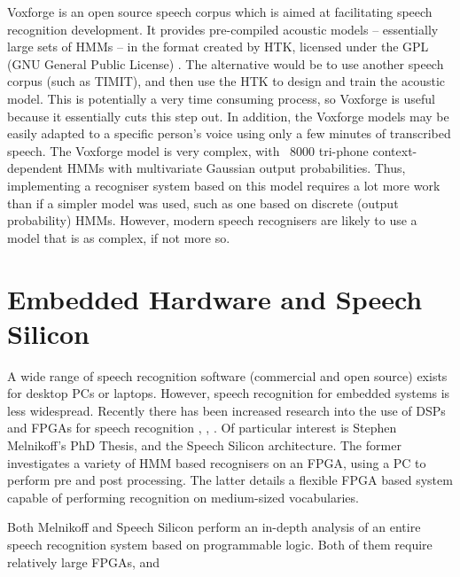 	Voxforge is an open source speech corpus which is aimed at facilitating speech recognition development.  It provides pre-compiled acoustic models -- essentially large sets of HMMs -- in the format created by HTK, licensed under the GPL (GNU General Public License) \cite{voxforge}.  The alternative would be to use another speech corpus (such as TIMIT), and then use the HTK to design and train the acoustic model.  This is potentially a very time consuming process, so Voxforge is useful because it essentially cuts this step out.  In addition, the Voxforge models may be easily adapted to a specific person's voice using only a few minutes of transcribed speech.  The Voxforge model is very complex, with ~8000 tri-phone context-dependent HMMs with multivariate Gaussian output probabilities.  Thus, implementing a recogniser system based on this model requires a lot more work than if a simpler model was used, such as one based on discrete (output probability) HMMs.  However, modern speech recognisers are likely to use a model that is as complex, if not more so.


\section{Embedded Hardware and Speech Silicon} %
\label{sec:embedded_hardware}
	A wide range of speech recognition software (commercial and open source) exists for desktop PCs or laptops.  However, speech recognition for embedded systems is less widespread.  Recently there has been increased research into the use of DSPs and FPGAs for speech recognition \cite{melnikoff2003speech}, \cite{schuster2006speech}, \cite{nedevschi2005hardware}.  Of particular interest is Stephen Melnikoff's PhD Thesis, and the Speech Silicon architecture.  The former investigates a variety of HMM based recognisers on an FPGA, using a PC to perform pre and post processing.  The latter details a flexible FPGA based system capable of performing recognition on medium-sized vocabularies.

	Both Melnikoff and Speech Silicon perform an in-depth analysis of an entire speech recognition system based on programmable logic.  Both of them require relatively large FPGAs, and 



